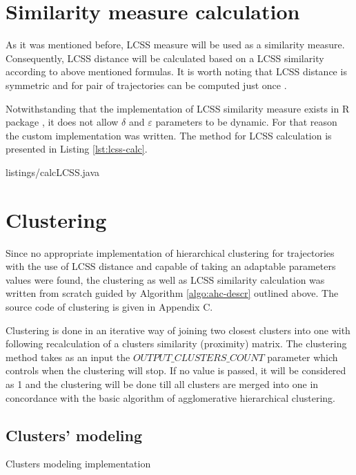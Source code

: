 \section{Similarity measure calculation}

As it was mentioned before, LCSS measure will be used as a similarity measure. Consequently, LCSS distance will be calculated based on a LCSS similarity according to above mentioned formulas. It is worth noting that LCSS distance is symmetric and for pair of trajectories can be computed just once \cite{inproceedings:28_lcss_dsmt}.

Notwithstanding that the implementation of LCSS similarity measure exists in R package \cite{online:r_lcss}, it does not allow $\delta$ and $\varepsilon$ parameters to be dynamic. For that reason the custom implementation was written. The method for LCSS calculation is presented in Listing \ref{lst:lcss-calc}. 

 {listings/calcLCSS.java}

\section{Clustering}

Since no appropriate implementation of hierarchical clustering for trajectories with the use of LCSS distance and capable of taking an adaptable parameters values were found, the clustering as well as LCSS similarity calculation was written from scratch guided by Algorithm \ref{algo:ahc-descr} outlined above. The source code of clustering is given in Appendix C. 

Clustering is done in an iterative way of joining two closest clusters into one with following recalculation of a clusters similarity (proximity) matrix. The clustering method takes as an input the $OUTPUT\_CLUSTERS\_COUNT$ parameter which controls when the clustering will stop. If no value is passed, it will be considered as 1 and the clustering will be done till all clusters are merged into one in concordance with the basic algorithm of agglomerative hierarchical clustering.


\subsection{Clusters' modeling}

Clusters modeling implementation
